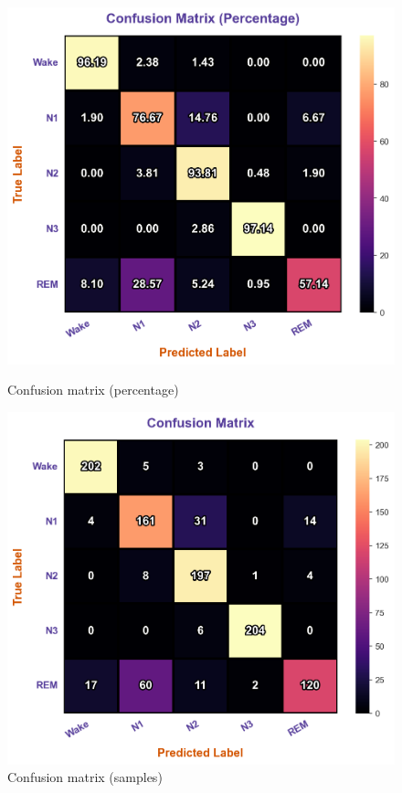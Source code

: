 \begin{figure}[htbp]
	\centering
	\begin{minipage}[b]{0.45\linewidth}
		\includegraphics[width=\linewidth]{img/paper_3/confusion matrix percentatge wise}
		\caption{Confusion matrix (percentage)}
		\label{fig:confusion-matrix-percentatge-wise}
	\end{minipage}
	\hfill
	\begin{minipage}[b]{0.45\linewidth}
		\includegraphics[width=\linewidth]{img/paper_3/confusion matrix samples}
		\caption{Confusion matrix (samples)}
		\label{fig:confusion-matrix-samples}
	\end{minipage}
\end{figure}


